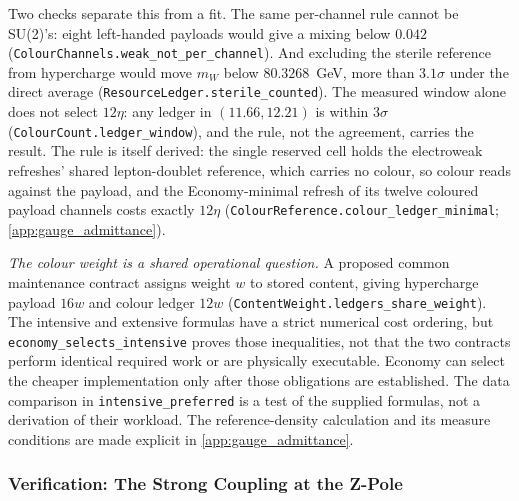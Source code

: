Two checks separate this from a fit. The same per-channel rule cannot be SU(2)'s: eight left-handed payloads would give a mixing below $0.042$ (\texttt{ColourChannels.weak\_not\_per\_channel}). And excluding the sterile reference from hypercharge would move $m_W$ below $80.3268$~GeV, more than $3.1\sigma$ under the direct average (\texttt{ResourceLedger.sterile\_counted}). The measured window alone does not select $12\eta$: any ledger in $(11.66,12.21)$ is within $3\sigma$ (\texttt{ColourCount.ledger\_window}), and the rule, not the agreement, carries the result. The rule is itself derived: the single reserved cell holds the electroweak refreshes' shared lepton-doublet reference, which carries no colour, so colour reads against the payload, and the Economy-minimal refresh of its twelve coloured payload channels costs exactly $12\eta$ (\texttt{ColourReference.colour\_ledger\_minimal}; \cref{app:gauge_admittance}).

\textit{The colour weight is a shared operational question.} A proposed common maintenance contract assigns weight $w$ to stored content, giving hypercharge payload $16w$ and colour ledger $12w$ (\texttt{ContentWeight.ledgers\_share\_weight}). The intensive and extensive formulas have a strict numerical cost ordering, but \texttt{economy\_selects\_intensive} proves those inequalities, not that the two contracts perform identical required work or are physically executable. Economy can select the cheaper implementation only after those obligations are established. The data comparison in \texttt{intensive\_preferred} is a test of the supplied formulas, not a derivation of their workload. The reference-density calculation and its measure conditions are made explicit in \cref{app:gauge_admittance}.

\subsubsection{Verification: The Strong Coupling at the Z-Pole}

